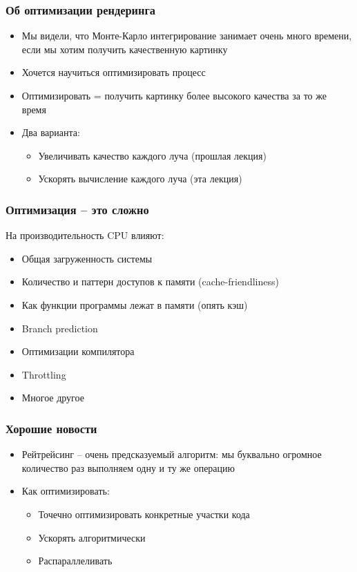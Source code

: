 \documentclass[handout,10pt]{beamer}
\begin{document}
\begin{frame}
\frametitle{Об оптимизации рендеринга}
\begin{itemize}
\item Мы видели, что Монте-Карло интегрирование занимает очень много времени, если мы хотим получить качественную картинку
\pause
\item Хочется научиться оптимизировать процесс
\pause
\item Оптимизировать = получить картинку более высокого качества за то же время
\pause
\item Два варианта:
\pause
\begin{itemize}
\item Увеличивать качество каждого луча (прошлая лекция)
\pause
\item Ускорять вычисление каждого луча (эта лекция)
\end{itemize}
\end{itemize}
\end{frame}

\begin{frame}[fragile]
\frametitle{Оптимизация -- это сложно}
На производительность CPU влияют:
\pause
\begin{itemize}
\item Общая загруженность системы
\pause
\item Количество и паттерн доступов к памяти (cache-friendliness)
\pause
\item Как функции программы лежат в памяти (опять кэш)
\pause
\item Branch prediction
\pause
\item Оптимизации компилятора
\pause
\item Throttling
\pause
\item Многое другое
\end{itemize}
\end{frame}

\begin{frame}[fragile]
\frametitle{Хорошие новости}
\begin{itemize}
\item Рейтрейсинг -- очень предсказуемый алгоритм: мы буквально огромное количество раз выполняем одну и ту же операцию
\pause
\item Как оптимизировать:
\pause
\begin{itemize}
\item Точечно оптимизировать конкретные участки кода
\pause
\item Ускорять алгоритмически
\pause
\item Распараллеливать
\end{itemize}
\end{itemize}
\end{frame}
\end{document}
